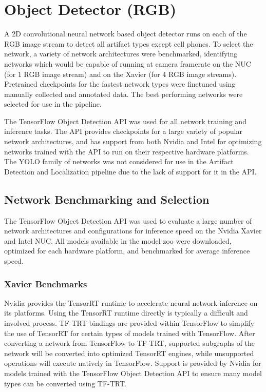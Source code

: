 \section{Object Detector (RGB)}

A 2D convolutional neural network based object detector runs on each of the RGB image stream to detect all artifact types except cell phones. To select the network, a variety of network architectures were benchmarked, identifying networks which would be capable of running at camera framerate on the NUC (for 1 RGB image stream) and on the Xavier (for 4 RGB image streams). Pretrained checkpoints for the fastest network types were finetuned using manually collected and annotated data. The best performing networks were selected for use in the pipeline.

The TensorFlow Object Detection API \cite{huang2017speed} was used for all network training and inference tasks. The API provides checkpoints for a large variety of popular network architectures, and has support from both Nvidia and Intel for optimizing networks trained with the API to run on their respective hardware platforms. The YOLO \cite{redmon2018yolov3} family of networks was not considered for use in the Artifact Detection and Localization pipeline due to the lack of support for it in the API.

\subsection{Network Benchmarking and Selection}

The TensorFlow Object Detection API was used to evaluate a large number of network architectures and configurations for inference speed on the Nvidia Xavier and Intel NUC. All models available in the model zoo were downloaded, optimized for each hardware platform, and benchmarked for average inference speed. 

\subsubsection{Xavier Benchmarks}

Nvidia provides the TensorRT runtime to accelerate neural network inference on its platforms. Using the TensorRT runtime directly is typically a difficult and involved process. TF-TRT bindings are provided within TensorFlow to simplify the use of TensorRT for certain types of models trained with TensorFlow. After converting a network from TensorFlow to TF-TRT, supported subgraphs of the network will be converted into optimized TensorRT engines, while unsupported operations will execute natively in TensorFlow. Support is provided by Nvidia for models trained with the TensorFlow Object Detection API to ensure many model types can be converted using TF-TRT. 

